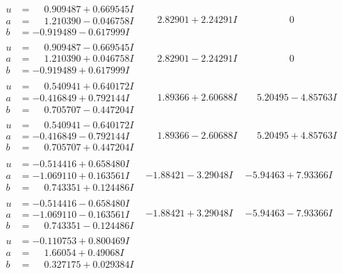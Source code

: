 \documentclass[1p]{elsarticle_modified}
\theoremstyle{definition}
\begin{document}
$$\begin{array}{c|c|c}
\begin{aligned}
u &= \phantom{-}0.909487 + 0.669545 I \\
a &= \phantom{-}1.210390 - 0.046758 I \\
b &= -0.919489 - 0.617999 I\end{aligned}
 & \phantom{-}2.82901 + 2.24291 I & \phantom{-0.000000 } 0 \\ \hline\begin{aligned}
u &= \phantom{-}0.909487 - 0.669545 I \\
a &= \phantom{-}1.210390 + 0.046758 I \\
b &= -0.919489 + 0.617999 I\end{aligned}
 & \phantom{-}2.82901 - 2.24291 I & \phantom{-0.000000 } 0 \\ \hline\begin{aligned}
u &= \phantom{-}0.540941 + 0.640172 I \\
a &= -0.416849 + 0.792144 I \\
b &= \phantom{-}0.705707 - 0.447204 I\end{aligned}
 & \phantom{-}1.89366 + 2.60688 I & \phantom{-}5.20495 - 4.85763 I \\ \hline\begin{aligned}
u &= \phantom{-}0.540941 - 0.640172 I \\
a &= -0.416849 - 0.792144 I \\
b &= \phantom{-}0.705707 + 0.447204 I\end{aligned}
 & \phantom{-}1.89366 - 2.60688 I & \phantom{-}5.20495 + 4.85763 I \\ \hline\begin{aligned}
u &= -0.514416 + 0.658480 I \\
a &= -1.069110 + 0.163561 I \\
b &= \phantom{-}0.743351 + 0.124486 I\end{aligned}
 & -1.88421 - 3.29048 I & -5.94463 + 7.93366 I \\ \hline\begin{aligned}
u &= -0.514416 - 0.658480 I \\
a &= -1.069110 - 0.163561 I \\
b &= \phantom{-}0.743351 - 0.124486 I\end{aligned}
 & -1.88421 + 3.29048 I & -5.94463 - 7.93366 I \\ \hline\begin{aligned}
u &= -0.110753 + 0.800469 I \\
a &= \phantom{-}1.66054 + 0.49068 I \\
b &= \phantom{-}0.327175 + 0.029384 I\end{aligned}

\end{array}$$
\end{document}
